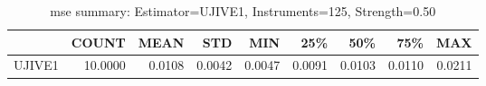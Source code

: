 \begin{table}[ht]
\centering
\caption{mse summary: Estimator=UJIVE1, Instruments=125, Strength=0.50}
\begin{tabular}{lrrrrrrrr}
\toprule
 & COUNT & MEAN & STD & MIN & 25\% & 50\% & 75\% & MAX \\
\midrule
UJIVE1 & 10.0000 & 0.0108 & 0.0042 & 0.0047 & 0.0091 & 0.0103 & 0.0110 & 0.0211 \\
\bottomrule
\end{tabular}
\end{table}
